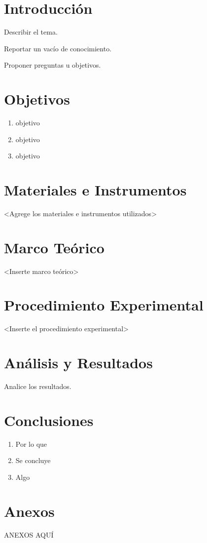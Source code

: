 \documentclass{article}
\begin{document}
    \section{Introducción}

    Describir el tema.

    Reportar un vacío de conocimiento.

    Proponer preguntas u objetivos.

    \section{Objetivos}

    \begin{enumerate}
        \item objetivo
        \item objetivo
        \item objetivo
    \end{enumerate}

    \section{Materiales e Instrumentos}

    <Agrege los materiales e instrumentos utilizados>

    \section{Marco Teórico}

    <Inserte marco teórico>

    \section{Procedimiento Experimental}

    <Inserte el procedimiento experimental>

    \section{Análisis y Resultados}

    Analice los resultados.

    \section{Conclusiones}

    \begin{enumerate}
        \item Por lo que
        \item Se concluye
        \item Algo
    \end{enumerate}


    \section{Anexos}

    ANEXOS AQUÍ
\end{document}
